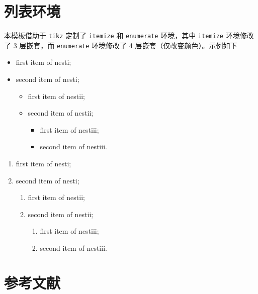 \documentclass[lang=cn,10pt,scheme=chinese]{boyogalaelegantbook}
\begin{document}
\section{列表环境}
本模板借助于 \lstinline{tikz} 定制了 \lstinline{itemize} 和 \lstinline{enumerate} 环境，其中 \lstinline{itemize} 环境修改了 3 层嵌套，而 \lstinline{enumerate} 环境修改了 4 层嵌套（仅改变颜色）。示例如下\\[2ex]
\begin{minipage}[b]{0.49\textwidth}
  \begin{itemize}
    \item first item of nesti;
    \item second item of nesti;
      \begin{itemize}
        \item first item of nestii;
        \item second item of nestii;
        \begin{itemize}
          \item first item of nestiii;
          \item second item of nestiii.
        \end{itemize}   
      \end{itemize}
  \end{itemize}
\end{minipage}
\begin{minipage}[b]{0.49\textwidth}
  \begin{enumerate}
    \item first item of nesti;
    \item second item of nesti;
      \begin{enumerate}
        \item first item of nestii;
        \item second item of nestii;
        \begin{enumerate}
          \item first item of nestiii;
          \item second item of nestiii.
        \end{enumerate}   
      \end{enumerate}
  \end{enumerate}
\end{minipage}

\section{参考文献}
\end{document}
